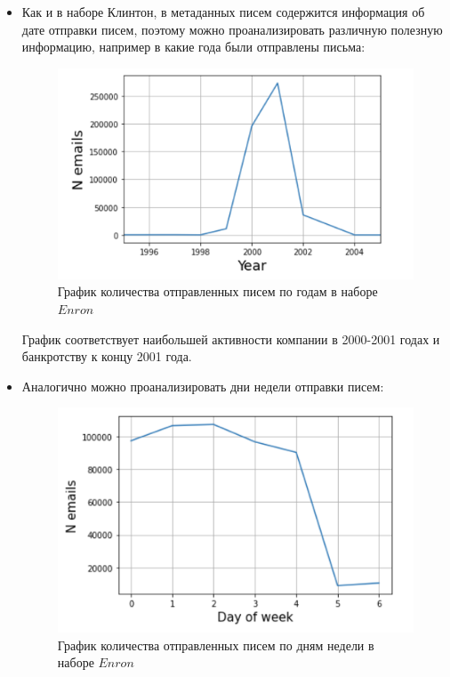 \begin{itemize}

\item Как и в наборе Клинтон, в метаданных писем содержится информация об дате отправки писем,
поэтому можно проанализировать различную полезную информацию, например в какие года
были отправлены письма:

\begin{figure}[H]
\centering
\includegraphics[scale=0.7]{pics/enron_year.png}
\caption{График количества отправленных писем по годам в наборе $Enron$}
\end{figure}

График соответствует наибольшей активности компании в 2000-2001 годах и банкротству к концу 2001 года.

\item Аналогично можно проанализировать дни недели отправки писем:

\begin{figure}[H]
\centering
\includegraphics[scale=0.7]{pics/enron_week.png}
\caption{График количества отправленных писем по дням недели в наборе $Enron$}
\end{figure}



\end{itemize}
